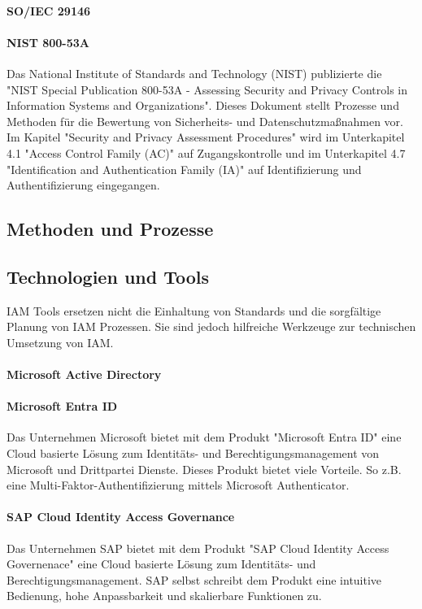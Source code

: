 \documentclass[10pt]{article}
\begin{document}
\paragraph{SO/IEC 29146}
\paragraph{NIST 800-53A}
Das National Institute of Standards and Technology (NIST) publizierte die "NIST Special Publication 800-53A - Assessing Security and Privacy Controls in Information Systems and Organizations". Dieses Dokument stellt Prozesse und Methoden für die Bewertung von Sicherheits- und Datenschutzmaßnahmen vor. Im Kapitel "Security and Privacy Assessment Procedures" wird im Unterkapitel 4.1 "Access Control Family (AC)" auf Zugangskontrolle und im Unterkapitel 4.7 "Identification and Authentication Family (IA)" auf Identifizierung und Authentifizierung eingegangen.
\subsection{Methoden und Prozesse}
\subsection{Technologien und Tools}
IAM Tools ersetzen nicht die Einhaltung von Standards und die sorgfältige Planung von IAM Prozessen. Sie sind jedoch hilfreiche Werkzeuge zur technischen Umsetzung von IAM.
\paragraph{Microsoft Active Directory}
\paragraph{Microsoft Entra ID}
Das Unternehmen Microsoft bietet mit dem Produkt "Microsoft Entra ID" eine Cloud basierte Lösung zum Identitäts- und Berechtigungsmanagement von Microsoft und Drittpartei Dienste. Dieses Produkt bietet viele Vorteile. So z.B. eine Multi-Faktor-Authentifizierung mittels Microsoft Authenticator.
\paragraph{SAP Cloud Identity Access Governance}
Das Unternehmen SAP bietet mit dem Produkt "SAP Cloud Identity Access Governenace" eine Cloud basierte Lösung zum Identitäts- und Berechtigungsmanagement. SAP selbst schreibt dem Produkt eine intuitive Bedienung, hohe Anpassbarkeit und skalierbare Funktionen zu.
\end{document}
